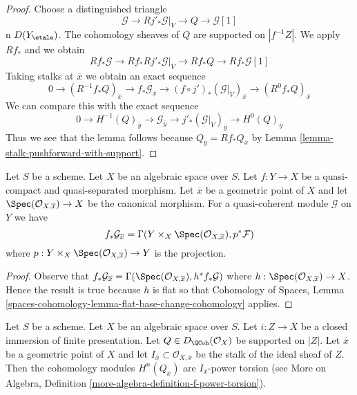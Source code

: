 \begin{proof}
Choose a distinguished triangle
$$
\mathcal{G} \to Rj'_*\mathcal{G}|_V \to Q \to \mathcal{G}[1]
$$
n $D(Y_\etale)$. The cohomology sheaves of $Q$
are supported on $|f^{-1}Z|$. We apply $Rf_*$ and we obtain
$$
Rf_*\mathcal{G} \to Rf_*Rj'_*\mathcal{G}|_V \to Rf_*Q
\to Rf_*\mathcal{G}[1]
$$
Taking stalks at $\overline{x}$ we obtain an exact sequence
$$
0 \to
(R^{-1}f_*Q)_{\overline{x}} \to
f_*\mathcal{G}_{\overline{x}} \to
(f \circ j')_*(\mathcal{G}|_V)_{\overline{x}} \to
(R^0f_*Q)_{\overline{x}}
$$
We can compare this with the exact sequence
$$
0 \to
H^{-1}(Q)_{\overline{y}} \to
\mathcal{G}_{\overline{y}} \to
j'_*(\mathcal{G}|_V)_{\overline{y}} \to
H^0(Q)_{\overline{y}}
$$
Thus we see that the lemma follows because
$Q_{\overline{y}} = Rf_*Q_{\overline{x}}$ by
Lemma \ref{lemma-stalk-pushforward-with-support}.
\end{proof}

\begin{lemma}
\label{lemma-stalk-of-pushforward}
Let $S$ be a scheme. Let $X$ be an algebraic space over $S$.
Let $f : Y \to X$ be a quasi-compact and quasi-separated morphism.
Let $\overline{x}$ be a geometric point of $X$ and let
$\Spec(\mathcal{O}_{X, \overline{x}}) \to X$
be the canonical morphism. For a quasi-coherent module
$\mathcal{G}$ on $Y$ we have
$$
f_*\mathcal{G}_{\overline{x}} =
\Gamma(Y \times_X \Spec(\mathcal{O}_{X, \overline{x}}), p^*\mathcal{F})
$$
where $p : Y \times_X \Spec(\mathcal{O}_{X, \overline{x}}) \to Y$
is the projection.
\end{lemma}

\begin{proof}
Observe that $f_*\mathcal{G}_{\overline{x}} =
\Gamma(\Spec(\mathcal{O}_{X, \overline{x}}), h^*f_*\mathcal{G})$
where $h : \Spec(\mathcal{O}_{X, \overline{x}}) \to X$.
Hence the result is true because $h$ is flat so that
Cohomology of Spaces, Lemma
\ref{spaces-cohomology-lemma-flat-base-change-cohomology}
applies.
\end{proof}

\begin{lemma}
\label{lemma-stalk-of-module-with-support}
Let $S$ be a scheme. Let $X$ be an algebraic space over $S$.
Let $i : Z \to X$ be a closed immersion of finite presentation.
Let $Q \in D_\QCoh(\mathcal{O}_X)$ be supported on $|Z|$.
Let $\overline{x}$ be a geometric point of $X$ and let
$I_{\overline{x}} \subset \mathcal{O}_{X, \overline{x}}$ be the stalk of
the ideal sheaf of $Z$. Then the cohomology modules
$H^n(Q_{\overline{x}})$ are $I_{\overline{x}}$-power torsion
(see More on Algebra, Definition
\ref{more-algebra-definition-f-power-torsion}).
\end{lemma}

